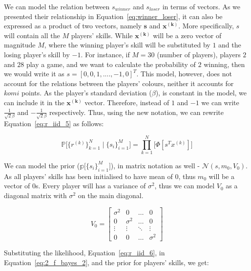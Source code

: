 \documentclass[a4paper,11pt]{article}
\theoremstyle{mytheor}
\begin{document}
We can model the relation between $s_{winner}$ and $s_{loser}$ in terms of vectors. As we presented their relationship in Equation~\ref{eq:winner_loser}, it can also be expressed as a product of two vectors, namely $\bm{s}$ and $\bm{x^{(k)}}$. More specifically, $s$ will contain all the $M$ players' skills. While $\bm{x^{(k)}}$ will be a zero vector of magnitude $M$, where the winning player's skill will be substituted by $1$ and the losing player's skill by $-1$. For instance, if $M=30$ (number of players), players $2$ and $28$ play a game, and we want to calculate the probability of $2$ winning, then we would write it as $s=[0,0,1,....,-1,0]^T$. This model, however, does not account for the relations between the players' colours, neither it accounts for $komi$ points. As the player's standard deviation ($\beta$), is constant in the model, we can include it in the $\bm{x^{(k)}}$ vector. Therefore, instead of $1$ and $-1$ we can write $\frac{1}{\sqrt{2}\beta}$ and $-\frac{1}{\sqrt{2}\beta}$ respectively. Thus, using the new notation, we can rewrite Equation~\ref{eq:r_iid_5} as follows:

\begin{equation}
    \label{eq:r_iid_6}
    \mathbb{P} \Big[ \{r^{(k)}\}_{k=1}^{N}  \mid \{s_i\}_{i=1}^{M} \Big] = 
    \prod_{k=1}^{N}\Big[
        \Phi[s^Tx^{(k)}]
    \Big]
\end{equation}

We can model the prior ($\mathbb{p} \Big[ \{s_i\}_{i=1}^{M} \Big]$), in matrix notation as well - $\mathcal{N}(s, m_0, V_0)$. As all players' skills has been initialised to have mean of 0, thus $m_0$ will be a vector of $0$s. Every player will has a variance of $\sigma^2$, thus we can model $V_0$ as a diagonal matrix with $\sigma^2$ on the main diagonal.

\begin{equation}
    \label{eq:V_0}
    V_0 = \begin{bmatrix}
            \sigma^2 &  0  & \ldots & 0\\
            0  &  \sigma^2 & \ldots & 0\\
            \vdots & \vdots & \ddots & \vdots\\
            0  &   0       &\ldots & \sigma^2
           \end{bmatrix}
\end{equation}

Substituting the likelihood, Equation~\ref{eq:r_iid_6}, in Equation~\ref{eq:2_f_bayes_2}, and the prior for players' skills, we get:
\end{document}
